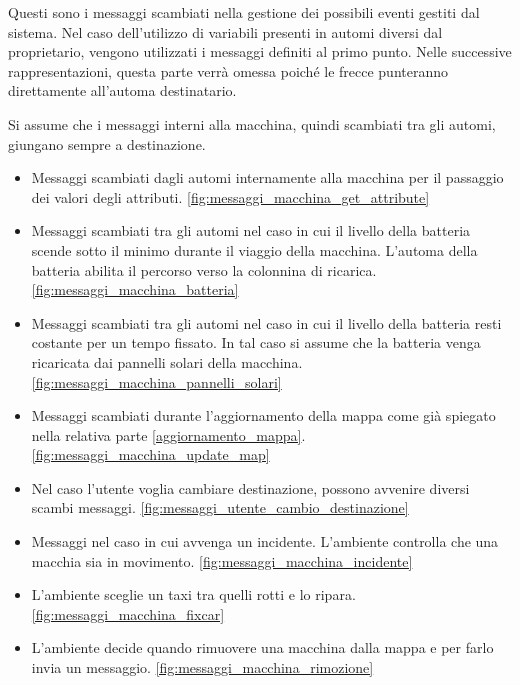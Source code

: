 Questi sono i messaggi scambiati nella gestione dei possibili eventi gestiti dal sistema. Nel caso dell'utilizzo di variabili presenti in automi diversi dal proprietario, vengono utilizzati i messaggi definiti al primo punto. Nelle successive rappresentazioni, questa parte verrà omessa poiché le frecce punteranno direttamente all'automa destinatario.

Si assume che i messaggi interni alla macchina, quindi scambiati tra gli automi, giungano sempre a destinazione.

\begin{itemize}
	\item Messaggi scambiati dagli automi internamente alla macchina per il passaggio dei valori degli attributi. \ref{fig:messaggi_macchina_get_attribute}
	\item Messaggi scambiati tra gli automi nel caso in cui il livello della batteria scende sotto il minimo durante il viaggio della macchina. L'automa della batteria abilita il percorso verso la colonnina di ricarica. \ref{fig:messaggi_macchina_batteria}
	\item Messaggi scambiati tra gli automi nel caso in cui il livello della batteria resti costante per un tempo fissato. In tal caso si assume che la batteria venga ricaricata dai pannelli solari della macchina. \ref{fig:messaggi_macchina_pannelli_solari}
	\item Messaggi scambiati durante l'aggiornamento della mappa come già spiegato nella relativa parte \ref{aggiornamento_mappa}. \ref{fig:messaggi_macchina_update_map}
	\item Nel caso l'utente voglia cambiare destinazione, possono avvenire diversi scambi messaggi. \ref{fig:messaggi_utente_cambio_destinazione}
	\item Messaggi nel caso in cui avvenga un incidente. L'ambiente controlla che una macchia sia in movimento. \ref{fig:messaggi_macchina_incidente}
	\item L'ambiente sceglie un taxi tra quelli rotti e lo ripara. \ref{fig:messaggi_macchina_fixcar}
	\item L'ambiente decide quando rimuovere una macchina dalla mappa e per farlo invia un messaggio. \ref{fig:messaggi_macchina_rimozione}
\end{itemize}

\newpage


